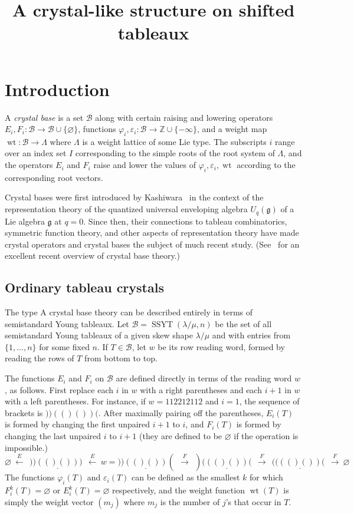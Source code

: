 \documentclass[ALCO,ThmDefs,Unicode,epreuves]{cedram}
\author{\firstname{Maria} \lastname{Gillespie}}
\author{\firstname{Jake} \lastname{Levinson}}
\author{\firstname{Kevin} \lastname{Purbhoo}}
\title
[A crystal-like structure on shifted tableaux]
{A crystal-like structure on shifted tableaux}
\DeclareMathOperator{\SSYT}{SSYT}
\DeclareMathOperator{\wt}{wt}
\newcommand{\B}{\mathcal{B}}
\begin{document}
\maketitle



\section{Introduction}

A \emph{crystal base} is a set $\B$ along with certain raising and lowering operators $E_i,F_i:\B\to \B\cup \{\varnothing\}$, functions $\varphi_i,\varepsilon_i:\B\to\mathbb{Z}\cup \{-\infty\}$, and a weight map $\wt:\B\to \Lambda$ where $\Lambda$ is a weight lattice of some Lie type. The subscripts $i$ range over an index set $I$ corresponding to the simple roots of the root system of $\Lambda$, and the operators $E_i$ and $F_i$ raise and lower the values of $\varphi_i,\varepsilon_i,\wt$ according to the corresponding root vectors.

Crystal bases were first introduced by Kashiwara~\cite{Kashiwara} in the context of the representation theory of the quantized universal enveloping algebra $U_q(\mathfrak{g})$ of a Lie algebra $\mathfrak{g}$ at $q=0$. Since then, their connections to tableau combinatorics, symmetric function theory, and other aspects of representation theory have made crystal operators and crystal bases the subject of much recent study. (See~\cite{Schilling} for an excellent recent overview of crystal base theory.)

\subsection{Ordinary tableau crystals}\label{sec:ordinary}

The type A crystal base theory can be described entirely in terms of semistandard Young tableaux. Let $\B = \SSYT(\lambda/\mu,n)$ be the set of all semistandard Young tableaux of a given skew shape $\lambda/\mu$ and with entries from $\{1,\ldots,n\}$ for some fixed $n$. If $T\in \B$, let $w$ be its row reading word, formed by reading the rows of $T$ from bottom to top.

The functions $E_i$ and $F_i$ on $\B$ are defined directly in terms of the reading word $w$, as follows. First replace each $i$ in $w$ with a right parentheses and each $i+1$ in $w$ with a left parentheses. For instance, if $w=112212112$ and $i=1$, the sequence of brackets is $))(()())($. After maximally pairing off the parentheses, $E_i(T)$ is formed by changing the first unpaired $i+1$ to $i$, and $F_i(T)$ is formed by changing the last unpaired $i$ to $i+1$ (they are defined to be $\varnothing$ if the operation is impossible.)
\[
\varnothing\ \xleftarrow{\ E\ }\ \ ))\underline{(()())})\ \ \xleftarrow{\ E\ }\ w = ))\underline{(()())}(\ \ \xrightarrow{\ F\ }\ \ )(\underline{(()())}(\ \ \xrightarrow{\ F\ }\ \ ((\underline{(()())}(\ \ \xrightarrow{\ F\ }\ \varnothing
\]
The functions $\varphi_i(T)$ and $\varepsilon_i(T)$ can be defined as the smallest $k$ for which $F_i^k(T)=\varnothing$ or $E_i^k(T)=\varnothing$ respectively, and the weight function $\wt(T)$ is simply the weight vector $(m_j)$ where $m_j$ is the number of $j$'s that occur in $T$.
\end{document}
